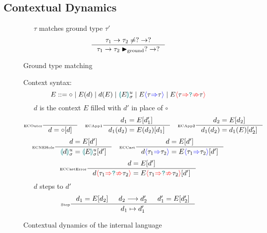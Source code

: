 \subsection{Contextual Dynamics}
\begin{figure}[H]
\ \ \ $\tau$ matches ground type $\tau'$
\[\inference[\tiny]{\tau_1 \to \tau_2 \neq ? \to ?}{\tau_1 \to \tau_2 \groundmatch ? \to ?}\]
\caption{Ground type matching}
\label{fig:groundmatch}
\end{figure}

\begin{figure}[H]
Context syntax:
\[E ::= \circ \mid E(d) \mid d(E) \mid \hole[E]^u_\sigma \mid E\scast{\tau}{\tau} \mid E\scasterror{\tau}{\tau}\]
\ \ \ $d$ is the context $E$ filled with $d'$ in place of $\circ$
\[\inference[\tiny ECOuter]{}{d = \circ[d]} \quad
\inference[\tiny ECApp1]{d_1 = E[d_1']}{d_1(d_2) = E(d_2)[d_1]}\quad
\inference[\tiny ECApp2]{d_2 = E[d_2]}{d_1(d_2) = d_1(E)[d_2']}\]
\[\inference[\tiny ECNEHole]{d=E[d']}{\hole[d]^u_\sigma = \hole[E]^u_\sigma [d']}\quad
\inference[\tiny ECCast]{d=E[d']}{d\scast{\tau_1}{\tau_2} = E\scast{\tau_1}{\tau_2}[d']}\]
\[\inference[\tiny ECCastError]{d=E[d']}{d\scasterror{\tau_1}{\tau_2} = E\scasterror{\tau_1}{\tau_2}[d']}\]
\ \ \ $d$ steps to $d'$
\[\inference[\tiny Step]{d_1=E[d_2] & d_2 \longrightarrow d_2' & d_1' = E[d_2']}{d_1 \mapsto d_1'}\]
\caption{Contextual dynamics of the internal language}
\label{fig:dynamics}
\end{figure}


